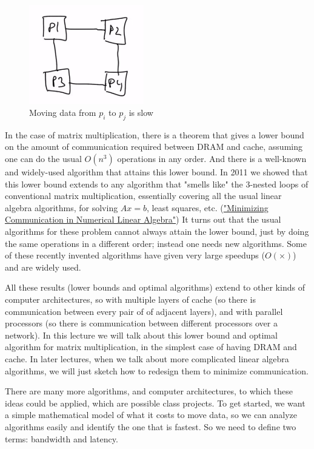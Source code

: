 \documentclass[11pt]{article}
\numberwithin{equation}{section}
\begin{document}
\begin{figure}[h]
    \centering
    \includegraphics[width=5cm]{images/lec4-2.png}
    \caption{Moving data from $p_i$ to $p_j$ is slow}
\end{figure}

In the case of matrix multiplication, there is a theorem that gives a lower bound on the amount of communication required
between DRAM and cache, assuming one can do the usual $O(n^3)$ operations in any order.  And there is a well-known and widely-used algorithm that attains this lower bound.
In 2011 we showed that this lower bound extends to any algorithm that "smells like" the 3-nested loops of conventional matrix multiplication,
essentially covering all the usual linear algebra algorithms, for solving $Ax=b$, least squares, etc. (\href{http://www.eecs.berkeley.edu/Pubs/TechRpts/2011/EECS-2011-15.html}{"Minimizing Communication in Numerical Linear Algebra"})
It turns out that the usual algorithms for these problem cannot always attain the lower bound, just by doing the same operations in a different order; 
instead one needs new algorithms. Some of these recently invented algorithms have given very large speedups ($O(\times)$) and are widely used.

All these results (lower bounds and optimal algorithms) extend to other kinds of computer architectures, so with multiple layers of cache 
(so there is communication between every pair of of adjacent layers), and with parallel processors 
(so there is communication between different processors over a network).
In this lecture we will talk about this lower bound and optimal algorithm for matrix multiplication, in the simplest case of having DRAM and cache.
In later lectures, when we talk about more complicated linear algebra algorithms, we will just sketch how to redesign them to minimize communication. 

There are many more algorithms, and computer architectures, to which these ideas could be applied, which are possible class projects.
To get started, we want a simple mathematical model of what it costs to move data, so we can analyze algorithms easily and identify the one that is fastest. 
So we need to define two terms: bandwidth and latency.
\end{document}
